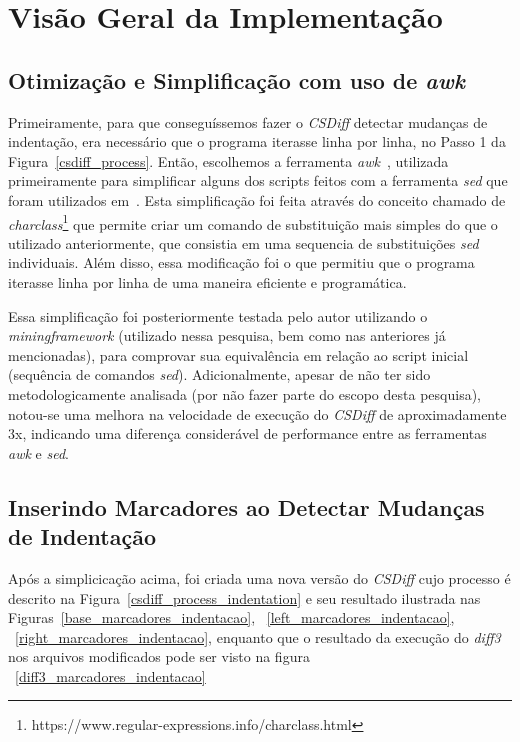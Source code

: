 \section{Visão Geral da Implementação}\label{implementacao}
\subsection{Otimização e Simplificação com uso de \emph{awk}}

Primeiramente, para que conseguíssemos fazer o \emph{CSDiff} detectar mudanças
de indentação, era necessário que o programa iterasse linha por linha, no Passo
1 da Figura~\ref{csdiff_process}. Então, escolhemos a ferramenta
\emph{awk}~\cite{awk}, utilizada primeiramente para simplificar alguns dos
scripts feitos com a ferramenta \emph{sed} que foram utilizados
em~\cite{clem21,heitor21}. Esta simplificação foi feita através do conceito
chamado de
\emph{charclass}\footnote{https://www.regular-expressions.info/charclass.html}
que permite criar um comando de substituição mais simples do que o utilizado
anteriormente, que consistia em uma sequencia de substituições \emph{sed}
individuais. Além disso, essa modificação foi o que permitiu que o programa
iterasse linha por linha de uma maneira eficiente e programática.

Essa simplificação foi posteriormente testada pelo autor utilizando o
\emph{miningframework} (utilizado nessa pesquisa, bem como nas anteriores já
mencionadas), para comprovar sua equivalência em relação ao script inicial
(sequência de comandos \emph{sed}). Adicionalmente, apesar de não ter sido
metodologicamente analisada (por não fazer parte do escopo desta pesquisa),
notou-se uma melhora na velocidade de execução do \emph{CSDiff} de
aproximadamente 3x, indicando uma diferença considerável de performance entre
as ferramentas \emph{awk} e \emph{sed}.

\subsection{Inserindo Marcadores ao Detectar Mudanças de Indentação}

Após a simplicicação acima, foi criada uma nova versão do \emph{CSDiff} cujo
processo é descrito na Figura~\ref{csdiff_process_indentation} e seu resultado
ilustrada nas Figuras~\ref{base_marcadores_indentacao},
~\ref{left_marcadores_indentacao}, ~\ref{right_marcadores_indentacao}, enquanto
que o resultado da execução do \emph{diff3} nos arquivos modificados pode
ser visto na figura ~\ref{diff3_marcadores_indentacao}

